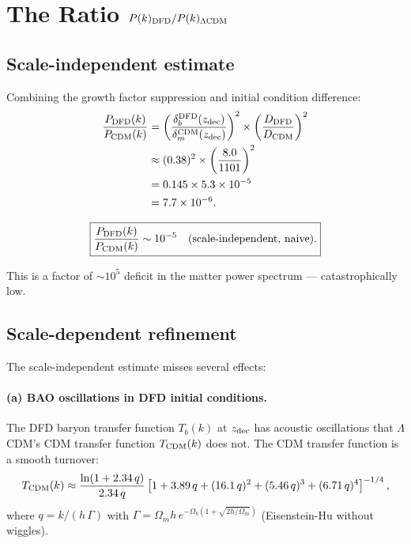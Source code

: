 \documentclass[aps,prd,twocolumn,nofootinbib]{revtex4-2}
\newcommand{\ee}[1]{\times 10^{#1}}
\newcommand{\LCDM}{$\Lambda$CDM}
\begin{document}
\section{The Ratio $P(k)_{\rm DFD}/P(k)_{\rm \Lambda CDM}$}
\label{sec:ratio}

\subsection{Scale-independent estimate}

Combining the growth factor suppression and initial condition
difference:
\begin{align}
\frac{P_{\rm DFD}(k)}{P_{\rm CDM}(k)}
&= \left(\frac{\delta_b^{\rm DFD}(z_{\rm dec})}
  {\delta_m^{\rm CDM}(z_{\rm dec})}\right)^2
\times \left(\frac{D_{\rm DFD}}{D_{\rm CDM}}\right)^2 \notag\\
&\approx (0.38)^2 \times \left(\frac{8.0}{1101}\right)^2 \notag\\
&= 0.145 \times 5.3\ee{-5} \notag\\
&= 7.7\ee{-6}.
\label{eq:Pk-ratio-naive}
\end{align}

\begin{equation}
\boxed{
\frac{P_{\rm DFD}(k)}{P_{\rm CDM}(k)} \sim 10^{-5}
\quad\text{(scale-independent, naive)}.
}
\label{eq:Pk-ratio-boxed}
\end{equation}

This is a factor of $\sim 10^5$ deficit in the matter power spectrum
--- catastrophically low.

\subsection{Scale-dependent refinement}

The scale-independent estimate misses several effects:

\paragraph{(a) BAO oscillations in DFD initial conditions.}
The DFD baryon transfer function $T_b(k)$ at $z_{\rm dec}$ has
acoustic oscillations that \LCDM{}'s CDM transfer function $T_{\rm CDM}(k)$
does not. The CDM transfer function is a smooth turnover:
\begin{equation}
T_{\rm CDM}(k) \approx \frac{\ln(1 + 2.34\,q)}{2.34\,q}
\left[1 + 3.89\,q + (16.1\,q)^2 + (5.46\,q)^3
+ (6.71\,q)^4\right]^{-1/4},
\end{equation}
where $q = k/(h\,\Gamma)$ with $\Gamma = \Omega_m h\,
e^{-\Omega_b(1+\sqrt{2h/\Omega_m})}$ (Eisenstein-Hu without wiggles).
\end{document}
